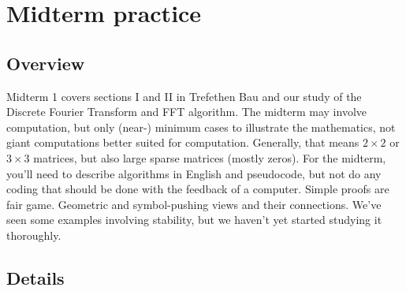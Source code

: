 \documentclass[lang=cn,11pt]{elegantbook}
\begin{document}
\chapter{Midterm practice}
\section{Overview}

Midterm 1 covers sections I and II in Trefethen Bau and our study of the Discrete Fourier Transform and FFT algorithm. The midterm may involve computation, but only (near-) minimum cases to illustrate the mathematics, not giant computations better suited for computation. Generally, that means $2\times2$ or $3\times3$ matrices, but also large sparse matrices (mostly zeros). For the midterm, you’ll need to describe algorithms in English and pseudocode, but not do any coding that should be done with the feedback of a computer. Simple proofs are fair game. Geometric and symbol-pushing views and their connections. We’ve seen some examples involving stability, but we haven’t yet started studying it thoroughly.

\section{Details}
\end{document}

